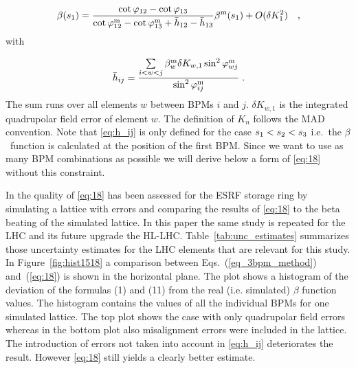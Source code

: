 \begin{equation}
\beta(s_1) = \frac{\cot\varphi_{12} - \cot\varphi_{13}}{\cot\varphi_{12}^\text{m} - \cot\varphi_{13}^\text{m} +\bar{h}_{12} - \bar{h}_{13}}\beta^\text{m}(s_1) + O(\delta K_1^2)\quad ,
\label{eq:18}
\end{equation}
with 

\begin{equation}
\bar{h}_{ij} =  \dfrac{\sum\limits_{i<w<j}\beta_w^\text{m}\delta K_{w,1}\sin^2\varphi_{wj}^\text{m}}{\sin^2\varphi_{ij}^\text{m}}\;.
\label{eq:h_ij}
\end{equation}
The sum runs over all elements $ w $ between BPMs $i$ and $j$. $\delta K_{w,1}$ is the integrated quadrupolar field error
of element $w$. The definition of $ K_n $ follows the MAD \cite{madx} convention.
Note that \eqref{eq:h_ij} is only defined for the case $ s_1 <\nobreak s_2 < s_3 $ i.e.~the
$ \beta $~function is calculated at the position of the first BPM. Since we want to use as many BPM
combinations as possible we will derive below a form of \eqref{eq:18} without this constraint.

In \cite{Franchi2016} the quality of \eqref{eq:18} has been assessed for the ESRF storage ring by
simulating a lattice with errors and comparing the results of \eqref{eq:18} to the beta beating of
the simulated lattice. In this paper the same study is repeated for the LHC and its future upgrade the HL-LHC.
Table~\ref{tab:unc_estimates} summarizes those uncertainty estimates for the LHC elements that are
relevant for this study. 
In Figure~\ref{fig:hist1518} a comparison between Eqs.~(\ref{eq_3bpm_method}) and~(\ref{eq:18}) is shown
in the horizontal plane. The plot shows a histogram of the deviation of the formulas (1) and (11)
from the real (i.e. simulated) $ \beta $ function values. The histogram contains the values of all the
individual BPMs for one simulated lattice. The top plot shows the case with only quadrupolar field
errors whereas in the bottom plot also misalignment errors were included in the lattice. The introduction
of errors not taken into account in \eqref{eq:h_ij} deteriorates the result. However \eqref{eq:18}
still yields a clearly better estimate.


